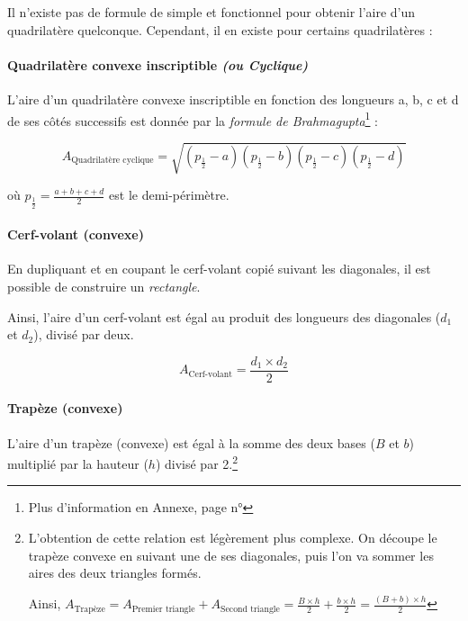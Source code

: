 \documentclass[a4paper, twoside]{article}
\begin{document}
Il n'existe pas de formule de simple et fonctionnel pour obtenir l'aire
d'un quadrilatère quelconque. Cependant, il en existe pour certains quadrilatères :

\vspace*{-0.25cm}

\paragraph*{Quadrilatère convexe inscriptible \textit{(ou Cyclique)}}

L'aire d'un quadrilatère convexe inscriptible en fonction des longueurs a, b, c et d de ses
côtés successifs est donnée par la \emph{formule de Brahmagupta}\footnote{Plus d'information en Annexe, page n°\pageref*{formule_de_Brahmagupta}} :

$$ A_{\text{Quadrilatère cyclique}} = \sqrt{(p_{\frac{1}{2}}-a)(p_{\frac{1}{2}}-b)(p_{\frac{1}{2}}-c)(p_{\frac{1}{2}}-d)} $$

où $p_{\frac{1}{2}} = \frac{a + b + c + d}{2}$ est le demi-périmètre.

\vspace*{-0.25cm}

\paragraph*{Cerf-volant (convexe)}

En dupliquant et en coupant le cerf-volant copié suivant les diagonales,
il est possible de construire un \textit{rectangle}.

Ainsi, l'aire d'un cerf-volant est égal au produit des longueurs
des diagonales ($d_{1}$ et $d_{2}$), divisé par deux.

$$A_{\text{Cerf-volant}} = \frac{ d_{1} \times d_{2} }{ 2 }$$

\vspace*{-0.25cm}

\paragraph*{Trapèze (convexe)}

L'aire d'un trapèze (convexe) est égal à la somme des
deux bases ($B$ et $b$) multiplié par la hauteur ($h$) divisé par 2.\footnote{
	L'obtention de cette relation est légèrement plus complexe.
	On découpe le trapèze convexe en suivant une de ses diagonales,
	puis l'on va sommer les aires des deux triangles formés.

	Ainsi, $A_{\text{Trapèze}} = A_{\text{Premier triangle}} + A_{\text{Second triangle}} = \frac{B \times h}{2} + \frac{b \times h}{2} = \frac {(B+b) \times h}{2}$
}
\end{document}
